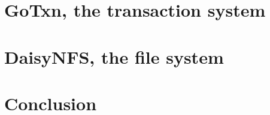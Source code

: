 \documentclass[11pt,twoside,final]{mitthesis}
\theoremstyle{definition}
\numberwithin{theorem}{chapter}
\begin{document}
\chapter{GoTxn, the transaction system}%
\label{ch:txn}


\chapter{DaisyNFS, the file system}%
\label{ch:daisy-nfs}


\chapter{Conclusion}%
\label{ch:conclusion}



\begin{spacing}{1}
{}

\end{spacing}
\end{document}
